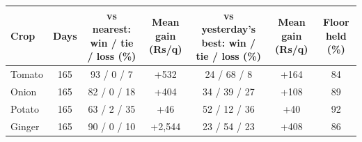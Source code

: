 \renewcommand{\arraystretch}{1.25}
\footnotesize
\begin{tabular}{|l|c|c|c|c|c|c|}
\hline
\textbf{Crop} & \textbf{Days} & \textbf{vs nearest: win / tie / loss (\%)} & \textbf{Mean gain (Rs/q)} & \textbf{vs yesterday's best: win / tie / loss (\%)} & \textbf{Mean gain (Rs/q)} & \textbf{Floor held (\%)} \\
\hline
Tomato & 165 & 93 / 0 / 7 & +532 & 24 / 68 / 8 & +164 & 84 \\
\hline
Onion & 165 & 82 / 0 / 18 & +404 & 34 / 39 / 27 & +108 & 89 \\
\hline
Potato & 165 & 63 / 2 / 35 & +46 & 52 / 12 / 36 & +40 & 92 \\
\hline
Ginger & 165 & 90 / 0 / 10 & +2,544 & 23 / 54 / 23 & +408 & 86 \\
\hline
\end{tabular}
